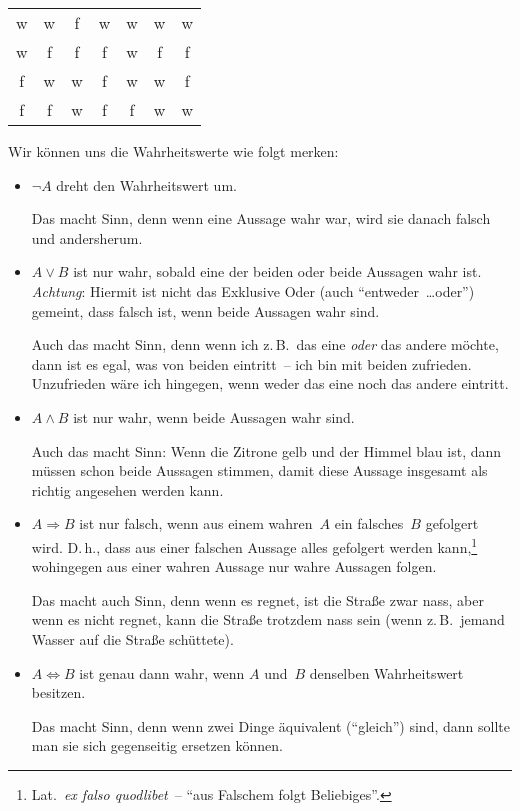 \documentclass[a4paper]{article}
\begin{document}
\begin{definition}
\begin{center}
\begin{tabular}{cc@{\colsep}ccccc}
            w   & w   & f        & w            & w          & w                 & w                     \\
            w   & f   & f        & f            & w          & f                 & f                     \\
            f   & w   & w        & f            & w          & w                 & f                     \\
            f   & f   & w        & f            & f          & w                 & w                     \\\bottomrule
        \end{tabular}
    \end{center}
\end{definition}

Wir können uns die Wahrheitswerte wie folgt merken:
\begin{itemize}
    \item $\neg A$ dreht den Wahrheitswert um.

          Das macht Sinn, denn wenn eine Aussage wahr war, wird sie danach falsch und andersherum.
    \item $A \vee B$ ist nur wahr, sobald eine der beiden oder beide Aussagen wahr ist. \emph{Achtung}: Hiermit ist nicht das Exklusive Oder (auch "`entweder~\dots oder"') gemeint, dass falsch ist, wenn beide Aussagen wahr sind.

          Auch das macht Sinn, denn wenn ich z.\,B.\ das eine \emph{oder} das andere möchte, dann ist es egal, was von beiden eintritt~-- ich bin mit beiden zufrieden. Unzufrieden wäre ich hingegen, wenn weder das eine noch das andere eintritt.
    \item $A \wedge B$ ist nur wahr, wenn beide Aussagen wahr sind.

          Auch das macht Sinn: Wenn die Zitrone gelb und der Himmel blau ist, dann müssen schon beide Aussagen stimmen, damit diese Aussage insgesamt als richtig angesehen werden kann.
    \item $A \Rightarrow B$ ist nur falsch, wenn aus einem wahren~$A$ ein falsches~$B$ gefolgert wird. D.\,h., dass aus einer falschen Aussage alles gefolgert werden kann,\footnote{Lat.\ \emph{ex falso quodlibet}~-- "`aus Falschem folgt Beliebiges"'.} wohingegen aus einer wahren Aussage nur wahre Aussagen folgen.

          Das macht auch Sinn, denn wenn es regnet, ist die Straße zwar nass, aber wenn es nicht regnet, kann die Straße trotzdem nass sein (wenn z.\,B.\ jemand Wasser auf die Straße schüttete).
    \item $A \Leftrightarrow B$ ist genau dann wahr, wenn $A$ und~$B$ denselben Wahrheitswert besitzen.

          Das macht Sinn, denn wenn zwei Dinge äquivalent ("`gleich"') sind, dann sollte man sie sich gegenseitig ersetzen können.
\end{itemize}
\end{document}
